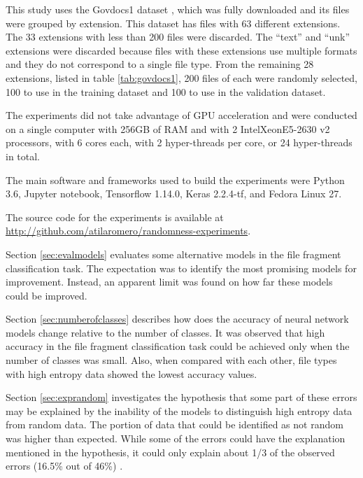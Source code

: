 This study uses the Govdocs1 dataset \cite{garfinkel_bringing_2009}, which was fully downloaded and its files were grouped by extension. This dataset has files with 63 different extensions. The 33 extensions with less than 200 files were discarded. The  ``text'' and ``unk'' extensions were discarded because files with these extensions use multiple formats and they do not correspond to a single file type. From the remaining 28 extensions, listed in table \ref{tab:govdocs1}, 200 files of each were randomly selected, 100 to use in the training dataset and 100 to use in the validation dataset.



The experiments did not take advantage of GPU acceleration and were  conducted on a single computer with 256GB of RAM and with 2 Intel\textregistered Xeon\textregistered E5-2630 v2 processors, with 6 cores each, with 2 hyper-threads per core, or 24 hyper-threads in total. 


The main software and frameworks used to build the experiments were Python 3.6, Jupyter notebook, Tensorflow 1.14.0, Keras 2.2.4-tf, and Fedora Linux 27.

The source code for the experiments is available at \sloppy\url{http://github.com/atilaromero/randomness-experiments}.

Section \ref{sec:evalmodels} evaluates some alternative models in the file fragment classification task. The expectation was to identify the most promising models for improvement. Instead, an apparent limit was found on how far these models could be improved. 

Section \ref{sec:numberofclasses} describes how does the accuracy of neural network models change relative to the number of classes. It was observed that high accuracy in the file fragment classification task could be achieved only when the number of classes was small. Also, when compared with each other, file types with high entropy data showed the lowest accuracy values.

Section \ref{sec:exprandom} investigates the hypothesis that some part of these errors may be explained by the inability of the models to distinguish high entropy data from random data. The portion of data that could be identified as not random was higher than expected. While some of the errors could have the explanation mentioned in the hypothesis, it could only explain about 1/3 of the observed errors (16.5\% out of 46\%) .







